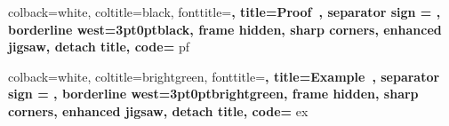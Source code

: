 {colback=white, %
coltitle=black, %
fonttitle=\large\bfseries\sffamily, %
title=Proof~\thetcbcounter, %
separator sign = \quad, %
borderline west={3pt}{0pt}{black}, %
frame hidden, %
sharp corners, %
enhanced jigsaw, %
detach title, %
code={} %
}{pf}

{colback=white, %
coltitle=brightgreen, %
fonttitle=\large\bfseries\sffamily, %
title=Example~\thetcbcounter, %
separator sign = \quad, %
borderline west={3pt}{0pt}{brightgreen}, %
frame hidden, %
sharp corners, %
enhanced jigsaw, %
detach title, %
code={} %
}{ex}



\usepackage[style=ddmmyyyy]{datetime2} %
\usepackage{lipsum} %
\usepackage{chemfig} %
